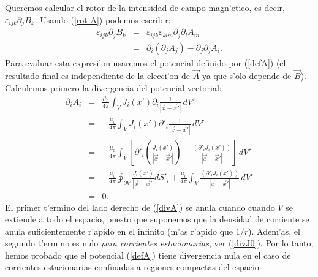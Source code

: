 Queremos calcular el rotor de la intensidad de campo magn'etico, es decir, $\varepsilon_{ijk}\partial_jB_k$. Usando (\ref{rot-A})
podemos escribir:
\begin{eqnarray}
 \varepsilon_{ijk}\partial_jB_k&=&\varepsilon_{ijk}\varepsilon_{
klm}\partial_j\partial_lA_m \\
&=&\partial_i(\partial_jA_j) -\partial_j\partial_jA_i. \label{rotB1}
\end{eqnarray}
Para evaluar esta expresi'on usaremos el potencial definido por (\ref{defA})
(el resultado final es independiente de la elecci'on de $\vec{A}$ ya que s'olo
depende de $\vec{B}$). Calculemos primero la divergencia del potencial
vectorial:
\begin{eqnarray}
\partial_iA_i&=&\frac{\mu_0}{4\pi}\int_VJ_i(x')\partial_i\frac{1}{\left\vert\vec
{x} -\vec{x}'\right\vert }\,dV' \\
&=& -\frac{\mu_0}{4\pi}\int_VJ_i(x')\partial'_i\frac{1}{\left\vert\vec{
x } -\vec{x}'\right\vert }\,dV' \\
&=&-\frac{\mu_0}{4\pi}\int_V\left[\partial'_i\left(\frac{J_i(x')}{
\left\vert\vec{x}-\vec{x}'\right\vert}\right)-\frac{
\left(\partial'_iJ_i(x')\right) } { \left\vert\vec{x} -\vec{x}'\right\vert
}\right]\,dV' \\
&=&-\frac{\mu_0}{4\pi}\oint_{\partial V}\frac{J_i(x')}{
\left\vert\vec{x}-\vec{x}'\right\vert}dS'_i+\frac{\mu_0}{4\pi}\int_V\frac{
\left(\partial'_iJ_i(x')\right) } {\left\vert\vec{x}
-\vec{x}'\right\vert}\,dV'  \label{divA} \\
&=&0. \label{divA0}
\end{eqnarray}
El primer t'ermino del lado derecho de (\ref{divA}) se anula cuando cuando $V$
se extiende a todo el espacio, puesto que suponemos que la densidad de corriente
se anula suficientemente r'apido en el infinito (m'as r'apido que $1/r$). Adem'as, el segundo t'ermino es nulo \textit{para corrientes estacionarias}, ver (\ref{divJ0}). Por lo tanto, hemos probado que el potencial (\ref{defA}) tiene divergencia nula en el caso de corrientes
estacionarias confinadas a regiones compactas del espacio.

